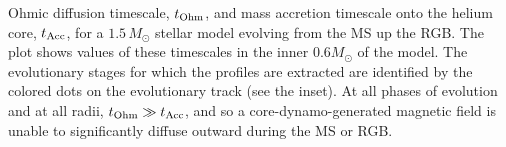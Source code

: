 \label{fig:timescales}
Ohmic diffusion timescale, $t_{\rm Ohm}$, and mass accretion timescale onto the helium core, $t_{\rm Acc}$, for a $1.5 \, M_\odot$ stellar model evolving from the MS up the RGB. The plot shows values of these timescales in the inner $0.6 M_\odot$ of the model. The evolutionary stages for which the profiles are extracted are identified by the colored dots on the evolutionary track (see the inset). At all phases of evolution and at all radii, $t_{\rm Ohm} \gg t_{\rm Acc}$, and so a core-dynamo-generated magnetic field is unable to significantly diffuse outward during the MS or RGB.
  